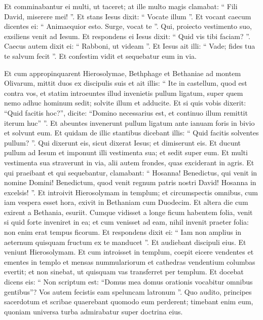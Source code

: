 \begin{biblechapter}
\begin{biblechapter}
\begin{biblechapter}
\begin{biblechapter}
\begin{biblechapter}
\begin{biblechapter}
\begin{biblechapter}
\begin{biblechapter}
\begin{biblechapter}
\begin{biblechapter}
\verse Et comminabantur ei multi, ut taceret; at ille multo magis clamabat: “ Fili David, miserere mei! ”. 
\verse Et stans Iesus dixit: “ Vocate illum ”. Et vocant caecum dicentes ei: “ Animaequior esto. Surge, vocat te ”. 
\verse Qui, proiecto vestimento suo, exsiliens venit ad Iesum. 
\verse Et respondens ei Iesus dixit: “ Quid vis tibi faciam? ”. Caecus autem dixit ei: “ Rabboni, ut videam ”. 
\verse Et Iesus ait illi: “ Vade; fides tua te salvum fecit ”. Et confestim vidit et sequebatur eum in via.
 
\begin{biblechapter}
\verse Et cum appropinquarent Hierosolymae, Bethphage et Bethaniae ad montem Olivarum, mittit duos ex discipulis suis 
\verse et ait illis: “ Ite in castellum, quod est contra vos, et statim introeuntes illud invenietis pullum ligatum, super quem nemo adhuc hominum sedit; solvite illum et adducite. 
\verse Et si quis vobis dixerit: “Quid facitis hoc?”, dicite: “Domino necessarius est, et continuo illum remittit iterum huc” ”. 
\verse Et abeuntes invenerunt pullum ligatum ante ianuam foris in bivio et solvunt eum. 
\verse Et quidam de illic stantibus dicebant illis: “ Quid facitis solventes pullum? ”. 
\verse Qui dixerunt eis, sicut dixerat Iesus; et dimiserunt eis. 
\verse Et ducunt pullum ad Iesum et imponunt illi vestimenta sua; et sedit super eum. 
\verse Et multi vestimenta sua straverunt in via, alii autem frondes, quas exciderant in agris. 
\verse Et qui praeibant et qui sequebantur, clamabant: “ Hosanna! Benedictus, qui venit in nomine Domini! 
\verse Benedictum, quod venit regnum patris nostri David! Hosanna in excelsis! ”.
 \verse Et introivit Hierosolymam in templum; et circumspectis omnibus, cum iam vespera esset hora, exivit in Bethaniam cum Duodecim.
 \verse Et altera die cum exirent a Bethania, esuriit. 
\verse Cumque vidisset a longe ficum habentem folia, venit si quid forte inveniret in ea; et cum venisset ad eam, nihil invenit praeter folia: non enim erat tempus ficorum. 
\verse Et respondens dixit ei: “ Iam non amplius in aeternum quisquam fructum ex te manducet ”. Et audiebant discipuli eius.
 \verse Et veniunt Hierosolymam. Et cum introisset in templum, coepit eicere vendentes et ementes in templo et mensas nummulariorum et cathedras vendentium columbas evertit; 
\verse et non sinebat, ut quisquam vas transferret per templum. 
\verse Et docebat dicens eis: “ Non scriptum est: “Domus mea domus orationis vocabitur omnibus gentibus”? Vos autem fecistis eam speluncam latronum ”.
 \verse Quo audito, principes sacerdotum et scribae quaerebant quomodo eum perderent; timebant enim eum, quoniam universa turba admirabatur super doctrina eius. 

\end{biblechapter}
\end{biblechapter}
\end{biblechapter}
\end{biblechapter}
\end{biblechapter}
\end{biblechapter}
\end{biblechapter}
\end{biblechapter}
\end{biblechapter}
\end{biblechapter}
\end{biblechapter}

